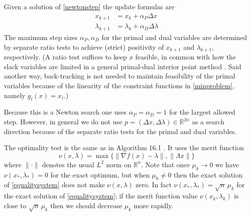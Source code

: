 \documentclass[11pt]{article}
\newcommand{\RR}{\mathbb{R}}
\newcommand{\grad}{\nabla}
\begin{document}
Given a solution of \eqref{newtonstep} the update formulas are
\begin{align*}
x_{k+1} &= x_k + \alpha_P \Delta x \\
\lambda_{k+1} &= \lambda_k + \alpha_D \Delta \lambda
\end{align*}
The maximum step sizes $\alpha_P,\alpha_D$ for the primal and dual variables are determined by separate ratio tests to achieve (strict) positivity of $x_{k+1}$ and $\lambda_{k+1}$, respectively.  (A ratio test suffices to keep $x$ feasible, in common with how the slack variables are limited in a general primal-dual interior point method \cite[subsection 16.7.2]{GrivaNashSofer2009}.  Said another way, back-tracking is not needed to maintain feasibility of the primal variables because of the linearity of the constraint functions in \eqref{minproblem}, namely $g_i(x)=x_i$.)

Because this is a Newton search one uses $\alpha_P=\alpha_D=1$ for the largest allowed step.  However, in general we do not use $p=(\Delta x,\Delta \lambda) \in \RR^{2n}$ as a search direction because of the separate ratio tests for the primal and dual variables.

The optimality test is the same as in Algorithm 16.1 \cite{GrivaNashSofer2009}.  It uses the merit function
\begin{equation}
    \nu(x,\lambda) = \max\{\|\grad f(x)-\lambda\|,\|\Lambda x\|\}  \label{merit}
\end{equation}
where $\|\cdot\|$ denotes the usual $L^2$ norm on $\RR^n$.  Note that once $\mu_k\to 0$ we have $\nu(x_*,\lambda_*) = 0$ for the exact optimum, but when $\mu_k \ne 0$ then the exact solution of \eqref{equalitysystem} does not make $\nu(x,\lambda)$ zero.  In fact $\nu(x_*,\lambda_*) = \sqrt{n}\, \mu_k$ for the exact solution of \eqref{equalitysystem}; if the merit function value $\nu(x_k,\lambda_k)$ is close to $\sqrt{n}\, \mu_k$ then we should decrease $\mu_k$ more rapidly.
\end{document}
